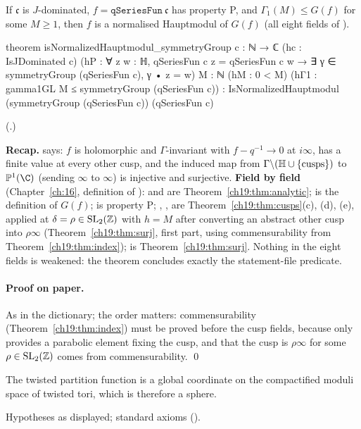 \begin{theorem}\label{ch19:thm:haupt}
If $\mathfrak c$ is $J$-dominated, $f=\mathtt{qSeriesFun}\ \mathfrak c$ has property P, and $\Gamma_1(M)\le G(f)$ for some $M\ge1$, then $f$ is a normalised Hauptmodul
of $G(f)$ (all eight fields of ).
\end{theorem}
\begin{leancode}
theorem isNormalizedHauptmodul_symmetryGroup {c : ℕ → ℂ} (hc : IsJDominated c)
    (hP : ∀ z w : ℍ, qSeriesFun c z = qSeriesFun c w →
      ∃ γ ∈ symmetryGroup (qSeriesFun c), γ • z = w)
    {M : ℕ} (hM : 0 < M) (hΓ1 : gamma1GL M ≤ symmetryGroup (qSeriesFun c)) :
    IsNormalizedHauptmodul (symmetryGroup (qSeriesFun c)) (qSeriesFun c)
\end{leancode}
(.)
\begin{dictionary}
\textbf{Recap.}   says: $f$ is holomorphic and $\Gamma$-invariant with $f-q^{-1}\to0$ at $i\infty$, has
a finite value at every other cusp, and the induced map from $\Gamma\backslash(\mathbb{H}\cup\{\text{cusps}\})$ to $\chnineteenP(\C)$ (sending
$\infty$ to $\infty$) is injective and surjective.  \textbf{Field by field} (Chapter~\ref{ch:16}, definition of ):  and  are
Theorem~\ref{ch19:thm:analytic};  is the definition of $G(f)$;  is property P; ,
,  are Theorem~\ref{ch19:thm:cusps}(c), (d), (e), applied at $\delta=\rho\in\mathrm{SL}_2(\mathbb{Z})$ with
$h=M$ after converting an abstract other cusp into $\rho\infty$ (Theorem~\ref{ch19:thm:surj}, first part, using commensurability from
Theorem~\ref{ch19:thm:index});  is Theorem~\ref{ch19:thm:surj}.  Nothing in the eight fields is weakened: the theorem
concludes exactly the statement-file predicate.
\end{dictionary}
\paragraph{Proof on paper.}  As in the dictionary; the order matters: commensurability (Theorem~\ref{ch19:thm:index}) must be proved before
the cusp fields, because  only provides a parabolic element fixing the cusp, and that the cusp is $\rho\infty$ for some
$\rho\in\mathrm{SL}_2(\mathbb{Z})$ comes from commensurability. \qed
\begin{physics}The twisted partition function is a global coordinate on the compactified moduli space of twisted tori, which is
therefore a sphere.\end{physics}
\begin{status}Hypotheses as displayed; standard axioms ().\end{status}


